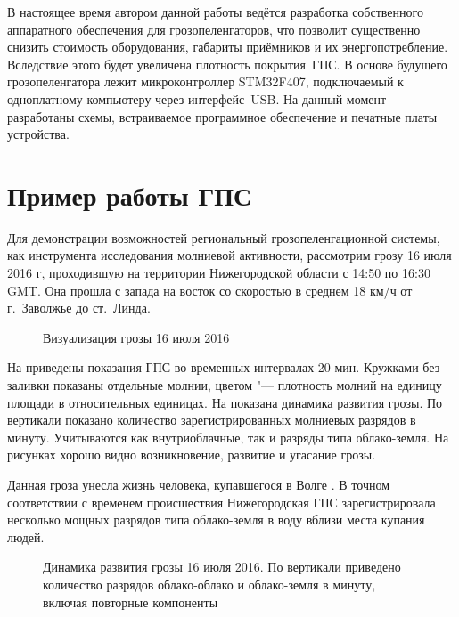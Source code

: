 В настоящее время автором данной работы ведётся разработка собственного аппаратного обеспечения для грозопеленгаторов, что позволит существенно снизить стоимость оборудования, габариты приёмников и их энергопотребление. Вследствие этого будет увеличена плотность покрытия~ГПС. В основе будущего грозопеленгатора лежит микроконтроллер STM32F407, подключаемый к одноплатному компьютеру через интерфейс~USB. На данный момент разработаны схемы, встраиваемое программное обеспечение и печатные платы устройства.

\section{Пример работы ГПС}
\label{sec:lds-example}

Для демонстрации возможностей региональный грозопеленгационной системы, как инструмента исследования молниевой активности, рассмотрим грозу 16 июля 2016 г, проходившую на территории Нижегородской области с 14:50 по 16:30 GMT. Она прошла с запада на восток со скоростью в среднем 18 км/ч от г.~Заволжье до ст.~Линда.

\begin{figure}[h]
	\caption{Визуализация грозы 16 июля 2016}
	\label{fig:lds-thunderstorm-move}
\end{figure}

На  приведены показания ГПС во временных интервалах 20 мин. Кружками без заливки показаны отдельные молнии, цветом "--- плотность молний на единицу площади в относительных единицах. На  показана динамика развития грозы. По вертикали показано количество зарегистрированных молниевых разрядов в минуту. Учитываются как внутриоблачные, так и разряды типа облако-земля. На рисунках хорошо видно возникновение, развитие и угасание грозы.

Данная гроза унесла жизнь человека, купавшегося в Волге \cite{newsnn2016}. В точном соответствии с временем происшествия Нижегородская ГПС зарегистрировала несколько мощных разрядов типа облако-земля в воду вблизи места купания людей.

\begin{figure}[h]
	\caption{Динамика развития грозы 16 июля 2016. По вертикали приведено количество разрядов облако-облако и облако-земля в минуту, включая повторные компоненты}
	\label{fig:lds-thunderstorm-freq}
\end{figure}

